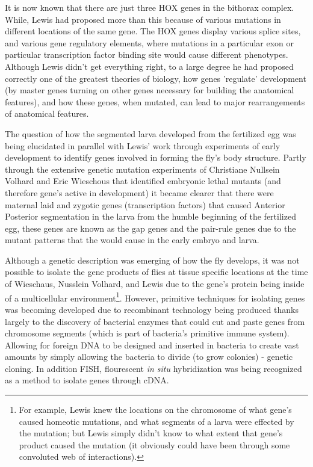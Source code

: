 It is now known that there are just three HOX genes in the bithorax complex.  While, Lewis had proposed more than this because of various mutations in different locations of the same gene.  The HOX genes display various splice sites, and various gene regulatory elements, where mutations in a particular exon or particular transcription factor binding site would cause different phenotypes.  Although Lewis didn't get everything right, to a large degree he had proposed correctly one of the greatest theories of biology, how genes 'regulate' development (by master genes turning on other genes necessary for building the anatomical features), and how these genes, when mutated, can lead to major rearrangements of anatomical features. 

The question of how the segmented larva developed from the fertilized egg was being elucidated in parallel with Lewis' work through experiments of early development to identify genes involved in forming the fly's body structure.  Partly through the extensive genetic mutation experiments of Christiane Nullsein Volhard and Eric Wieschous that identified embryonic lethal mutants (and therefore gene's active in development) it became clearer that there were maternal laid and zygotic genes (transcription factors) that caused Anterior Posterior segmentation in the larva from the humble beginning of the fertilized egg, these genes are known as the gap genes and the pair-rule genes due to the mutant patterns that the would cause in the early embryo and larva\cite{pmid6776413}.  

Although a genetic description was emerging of how the fly develops, it was not possible to isolate the gene products of flies at tissue specific locations at the time of Wieschaus, Nusslein Volhard, and Lewis due to the gene's protein being inside of a multicellular environment\footnote{For example, Lewis knew the locations on the chromosome of what gene's caused homeotic mutations, and what segments of a larva were effected by the mutation; but Lewis simply didn't know to what extent that gene's product caused the mutation (it obviously could have been through some convoluted web of interactions).}.  However, primitive techniques for isolating genes was becoming developed due to recombinant technology being produced thanks largely to the discovery of bacterial enzymes that could cut and paste genes from chromosome segments (which is part of bacteria's primitive immune system).  Allowing for foreign DNA to be designed and inserted in bacteria to create vast amounts by simply allowing the bacteria to  divide (to grow colonies) - genetic cloning. In addition FISH, flourescent \textit{in situ} hybridization was being recognized as a method to isolate genes through cDNA.
 
